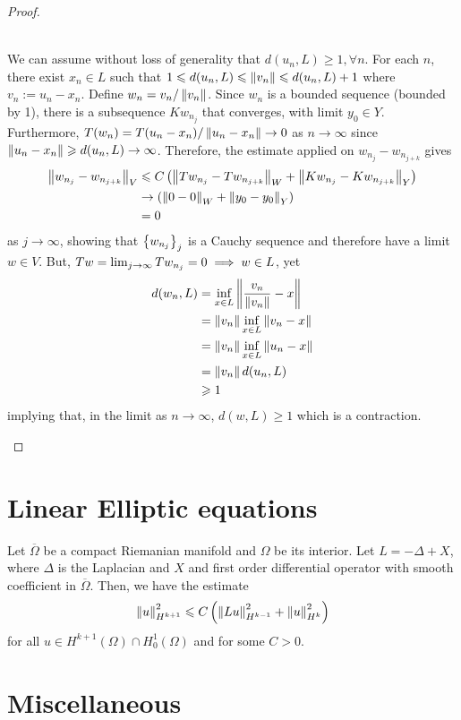 \documentclass[12pt]{article}
\begin{document}
\begin{proof}
    \begin{case} \hfill \\
        We can assume without loss of generality that $d(u_n, L) \geq 1, \forall n$. For each $n$, there exist $x_n \in L$ such that $1 \leq d(u_n, L) \leq \norm[v_n] \leq d(u_n, L) + 1$ where $v_n := u_n - x_n$. Define $w_n = v_n / \norm[v_n]$. Since $w_n$ is a bounded sequence (bounded by 1), there is a subsequence $Kw_{n_j}$ that converges, with limit $y_0 \in Y$. Furthermore, $T(w_n) = T(u_n - x_n) / \norm[u_n - x_n] \to 0$ as $n \to \infty$ since $\norm[u_n - x_n] \geq d(u_n, L) \to \infty$. Therefore, the estimate applied on $w_{n_j} - w_{n_{j + k}}$ gives
        \begin{align*}
        \norm[w_{n_j} - w_{n_{j + k}}]_V
        & \leq C \brac{\norm[Tw_{n_j} - Tw_{n_{j + k}}]_W + \norm[Kw_{n_j} - Kw_{n_{j + k}}]_Y} \\
        & \to  \brac{\norm[0 - 0]_W + \norm[y_0 - y_0]_Y} \\
        & = 0 
        \end{align*}
        as $j \to \infty$, showing that $\set{w_{n_j}}_j$ is a Cauchy sequence and therefore have a limit $w \in V$. But, $Tw = \Lim[j] Tw_{n_j} = 0 \implies w \in L$, yet 
        \begin{align*}
        d(w_n, L) 
        &= \inf_{x \in L} \norm[\frac{v_n}{\norm[v_n]} - x] \\
        &= \norm[v_n] \inf_{x \in L} \norm[v_n - x] \\
        &= \norm[v_n] \inf_{x \in L} \norm[u_n - x] \\
        &= \norm[v_n] d(u_n, L) \\
        &\geq 1
        \end{align*}
        implying that, in the limit as $n \to \infty$, $d(w, L) \geq 1$ which is a contraction. 
    \end{case}
\end{proof}




\section{Linear Elliptic equations \cite[Chapter 5]{taylor_pde}}
\begin{ftheorem} Let $\overline{\Omega}$ be a compact Riemanian manifold and $\Omega$ be its interior. Let $L = -\Delta + X$, where $\Delta$ is the Laplacian and $X$ and first order differential operator with smooth coefficient in $\overline{\Omega}$. Then, we have the estimate
\begin{align*}
\norm[u]_{H^{k +1}}^2 \leq C \brac{\norm[Lu]_{H^{k -1}}^2 + \norm[u]_{H^k}^2}
\end{align*}
for all $u \in H^{k + 1}(\Omega) \cap H^1_0(\Omega)$ and for some $C > 0$. 
\end{ftheorem}






\section{Miscellaneous}



\end{document}
